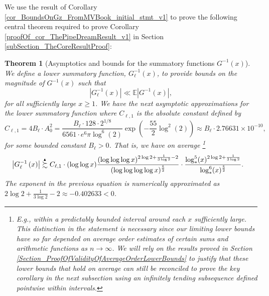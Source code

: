 \documentclass[11pt,reqno,a4letter]{article}
\numberwithin{figure}{section}
\numberwithin{table}{section}
\theoremstyle{plain}
\newtheorem{theorem}{Theorem}
\numberwithin{theorem}{section}
\theoremstyle{definition}
\newcommand{\SuccSim}[0]{\overset{_{\scriptsize{\blacktriangle}}}{\succsim}}
\begin{document}
We use the result of 
Corollary \ref{cor_BoundsOnGz_FromMVBook_initial_stmt_v1} 
to prove the following central theorem required to prove 
Corollary \ref{proofOf_cor_ThePipeDreamResult_v1} in Section \ref{subSection_TheCoreResultProof}: 

\begin{theorem}[Asymptotics and bounds for the summatory functions $G^{-1}(x)$] 
\label{theorem_gInv_GeneralAsymptoticsForms}
We define a lower summatory function, $G_{\ell}^{-1}(x)$, 
to provide bounds on the magnitude of $G^{-1}(x)$ such that 
$$|G_{\ell}^{-1}(x)| \ll \mathbb{E}|G^{-1}(x)|,$$ for all sufficiently large $x \geq 1$. 
We have the next asymptotic approximations for the lower summatory function where 
$C_{\ell,1}$ is the absolute constant defined by 
\[
C_{\ell,1} = 4B_{\ell} \cdot A_0^2  = 
     \frac{B_{\ell} \cdot 128 \cdot 2^{1/8}}{6561 \cdot e^6 \pi \log^6(2)} 
     \exp\left(-\frac{55}{2} \log^2(2)\right) 
     \approx B_{\ell} \cdot 2.76631 \times 10^{-10}, 
\]
for some bounded constant $B_{\ell} > 0$. 
That is, we have on average \footnote{ 
     E.g., within a predictably bounded interval around each $x$ sufficiently large. 
     This distinction in the statement is necessary since our limiting lower bounds have 
     so far depended on average order estimates of certain sums and arithmetic functions 
     as $n \rightarrow \infty$. We will rely on the results proved in 
     Section \ref{Section_ProofOfValidityOfAverageOrderLowerBounds} to justify that these 
     lower bounds that hold on average can still be reconciled to prove 
     the key corollary in the next subsection using an infinitely tending subsequence 
     defined pointwise within intervals. 
}
\begin{align*} 
 & \left\lvert G_{\ell}^{-1}\left(x\right) \right\rvert
     \SuccSim 
     C_{\ell,1} \cdot (\log\log x) \frac{(\log\log\log x)^{2\log 2+\frac{1}{3\log 2} - 2}}{ 
     (\log\log\log\log x)^{\frac{5}{2}}} \cdot \frac{\log_{\ast}^5(x)^{2\log 2 + \frac{1}{3\log 2}}}{ 
     \log_{\ast}^{6}(x)^{\frac{5}{2}}}. 
\end{align*} 
The exponent in the previous equation is numerically approximated as 
$2\log 2 + \frac{1}{3\log 2} -2 \approx -0.402633 < 0$. 
\end{theorem} 
\end{document}

